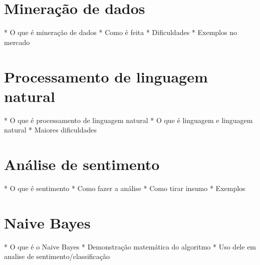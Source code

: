 \section{Mineração de dados}\label{sec:mineracao_dados}
* O que é mineração de dados
* Como é feita
* Dificuldades
* Exemplos no mercado


\section{Processamento de linguagem natural}\label{sec:nlp}
* O que é processamento de linguagem natural
* O que é linguagem e linguagem natural
* Maiores dificuldades


\section{Análise de sentimento}\label{sec:analise_sentimento}
* O que é sentimento
* Como fazer a análise
* Como tirar insumo
* Exemplos 



\section{Naive Bayes}\label{sec:naive_bayes}
* O que é o Naive Bayes
* Demonstração matemática do algoritmo
* Uso dele em analise de sentimento/classificação
